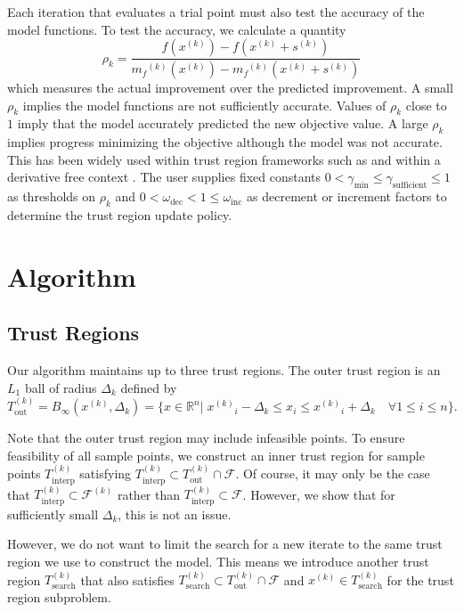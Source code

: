 \documentclass{article}
\theoremstyle{case}
\newcommand{\xk}{{x^{(k)}}}
\newcommand{\Rn}{\mathbb R^n}
\newcommand{\dk}{\Delta_k}
\newcommand{\mfk}{{{m}_f}^{(k)}}
\newcommand{\sk}{{{s}^{(k)}}}
\newcommand{\outertrk}{{T_{\text{out}}^{(k)}}}
\newcommand{\searchtrk}{{T_{\text{search}}^{(k)}}}
\newcommand{\sampletrk}{{T_{\text{interp}}^{(k)}}}
\newcommand{\feasible}{{\mathcal F}}
\newcommand{\feasiblek}{{\mathcal F^{(k)}}}
\newcommand{\gammasm}{\gamma_{\text{min}}}
\newcommand{\gammabi}{\gamma_{\text{sufficient}}}
\newcommand{\tr}{{ B_{\infty}\left(\xk, \dk\right) }}
\begin{document}
Each iteration that evaluates a trial point must also test the accuracy of the model functions.
To test the accuracy, we calculate a quantity
\begin{equation}
\label{rho}
\rho_k = \frac{f(\xk) - f(\xk+\sk)}{\mfk(\xk) - \mfk(\xk+\sk)}
\end{equation}
which measures the actual improvement over the predicted improvement.
A small $\rho_k$ implies the model functions are not sufficiently accurate.
Values of $\rho_k$ close to $1$ imply that the model accurately predicted the new objective value.
A large $\rho_k$ implies progress minimizing the objective although the model was not accurate.
This has been widely used within trust region frameworks such as \cite{Conn:2000:TM:357813} and within a derivative free context \cite{DUMMY:intro_book}.
The user supplies fixed constants $0 < \gammasm \le \gammabi \le 1$ as thresholds on $\rho_k$ and $0 < \omega_{\text{dec}} < 1 \le \omega_{\text{inc}}$ as decrement or increment factors to determine the trust region update policy.


\section{Algorithm}

\subsection{Trust Regions}
Our algorithm maintains up to three trust regions.
The outer trust region is an $L_1$ ball of radius $ \dk $ defined by
\begin{equation}
\label{trust_region}
\outertrk = \tr = \{x\in \Rn | \; {\xk}_i - \dk \le x_i \le {\xk}_i + \dk \quad \forall 1\le i \le n\}.
\end{equation}

Note that the outer trust region may include infeasible points.
To ensure feasibility of all sample points, we construct an inner trust region for sample points $ \sampletrk $  satisfying 
$\sampletrk \subset \outertrk \cap \feasible$.
Of course, it may only be the case that $\sampletrk \subset \feasiblek$ rather than $\sampletrk \subset \feasible$.
However, we show that for sufficiently small $\dk$, this is not an issue.

However, we do not want to limit the search for a new iterate to the same trust region we use to construct the model.
This means we introduce another trust region $ \searchtrk $ that also satisfies 
$ \searchtrk \subset \outertrk \cap \feasible$ and $\xk \in \searchtrk $ for the trust region subproblem.
\end{document}

